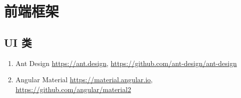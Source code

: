 \section{前端框架}

\subsection{UI 类}

\begin{enumerate}
    \item Ant Design \url{https://ant.design}, \url{https://github.com/ant-design/ant-design}
    \item Angular Material \url{https://material.angular.io}, \url{https://github.com/angular/material2}
\end{enumerate}